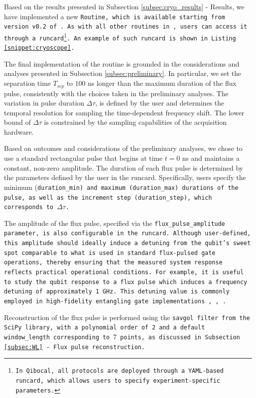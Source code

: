 Based on the results presented in Subsection \ref{subsec:cryo_results} - Results, we have implemented a new \tt{Routine}, which is available starting from version v0.2 of \Qibocal. 
As with all other routines in \Qibocal, users can access it through a runcard\footnote{In Qibocal, all protocols are deployed through a YAML-based runcard, which allows users to specify experiment-specific parameters.}. 
An example of such runcard is shown in Listing \ref{snippet:cryoscope}.

The final implementation of the routine is grounded in the considerations and analyses presented in Subsection \ref{subsec:preliminary}. 
In particular, we set the separation time $T_{sep}$ to $100$ ns longer than the maximum duration of the flux pulse, consistently with the choices taken in the preliminary analyses. 
The variation in pulse duration $\Delta\tau$, is defined by the user and determines the temporal resolution for sampling the time-dependent frequency shift. 
The lower bound of $\Delta\tau$ is constrained by the sampling capabilities of the acquisition hardware.

Based on outcomes and considerations of the preliminary analyses, we chose to use a standard rectangular pulse that begins at time $t = 0$ ns and maintains a constant, non-zero amplitude. 
The duration of each flux pulse is determined by the parameters defined by the user in the runcard. 
Specifically, users specify the minimum (\tt{duration\_min}) and maximum (\tt{duration\_max}) durations of the pulse, as well as the increment step (\tt{duration\_step}), which corresponds to $\Delta\tau$.

The amplitude of the flux pulse, specified via the \tt{flux\_pulse\_amplitude} parameter, is also configurable in the runcard. 
Although user-defined, this amplitude should ideally induce a detuning from the qubit's sweet spot comparable to what is used in standard flux-pulsed gate operations, thereby ensuring that the measured system response reflects practical operational conditions.
For example, it is useful to study the qubit response to a flux pulse which induces a frequency detuning of approximately 1 GHz. 
This detuning value is commonly employed in high-fidelity entangling gate implementations \cite{Langford2017}, \cite{Bultink_2020}, \cite{Rol2019iju}.

Reconstruction of the flux pulse is performed using the \tt{savgol} filter from the SciPy library, with a polynomial order of 2 and a default \tt{window\_length} corresponding to $7$ points, as discussed in Subsection \ref{subsec:WL} - Flux pulse reconstruction.

